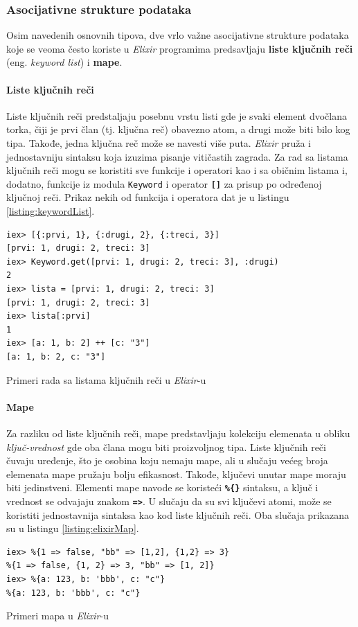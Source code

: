 \documentclass[12pt,oneside]{memoir}
\begin{document}
\subsubsection{Asocijativne strukture podataka}
Osim navedenih osnovnih tipova, dve vrlo važne asocijativne strukture podataka koje se 
veoma često koriste u \emph{Elixir} programima predsavljaju \textbf{liste ključnih reči} (eng.
\emph{keyword list}) i \textbf{mape}.
\paragraph{Liste ključnih reči}
Liste ključnih reči predstaljaju posebnu vrstu listi gde je svaki element dvočlana torka,
čiji je prvi član (tj. ključna reč) obavezno atom, a drugi može biti bilo kog tipa. Takođe,
jedna ključna reč može se navesti više puta. \emph{Elixir} pruža i jednostavniju sintaksu koja izuzima
pisanje vitičastih zagrada. Za rad sa listama ključnih reči mogu se koristiti sve funkcije i
operatori kao i sa običnim listama i, dodatno, funkcije iz modula \texttt{Keyword} i operator
\texttt{\textbf{[\smallskip]}} za prisup po određenoj ključnoj reči. Prikaz nekih od funkcija i operatora
dat je u listingu \ref{listing:keywordList}.
\begin{listing}[!h]
\begin{verbatim}
iex> [{:prvi, 1}, {:drugi, 2}, {:treci, 3}]
[prvi: 1, drugi: 2, treci: 3]
iex> Keyword.get([prvi: 1, drugi: 2, treci: 3], :drugi)
2
iex> lista = [prvi: 1, drugi: 2, treci: 3]
[prvi: 1, drugi: 2, treci: 3]
iex> lista[:prvi]
1
iex> [a: 1, b: 2] ++ [c: "3"]
[a: 1, b: 2, c: "3"]
\end{verbatim}
\caption{Primeri rada sa listama ključnih reči u \emph{Elixir}-u}
\label{listing:keywordList}
\end{listing}

\paragraph{Mape}
Za razliku od liste ključnih reči, mape predstavljaju kolekciju elemenata u obliku
\emph{ključ-vrednost} gde oba člana mogu biti proizvoljnog tipa. Liste ključnih
reči čuvaju uređenje, što je osobina koju nemaju mape, ali u slučaju većeg broja elemenata
mape pružaju bolju efikasnost. Takođe, ključevi unutar mape moraju biti jedinstveni.
Elementi mape navode se koristeći \texttt{\textbf{\%\{\}}} sintaksu, a ključ i vrednost se
odvajaju znakom \texttt{\textbf{=>}}. U slučaju da su svi ključevi atomi, može se koristiti
jednostavnija sintaksa kao kod liste ključnih reči. Oba slučaja prikazana su u listingu 
\ref{listing:elixirMap}.
\begin{listing}[!h]
\begin{verbatim}
iex> %{1 => false, "bb" => [1,2], {1,2} => 3}
%{1 => false, {1, 2} => 3, "bb" => [1, 2]}
iex> %{a: 123, b: 'bbb', c: "c"}
%{a: 123, b: 'bbb', c: "c"}
\end{verbatim}
\caption{Primeri mapa u \emph{Elixir}-u}
\label{listing:elixirMap}
\end{listing}
\end{document}
